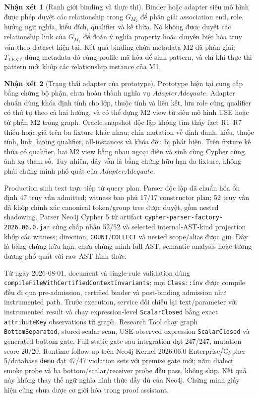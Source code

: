 \documentclass[11pt,a4paper]{article}
\theoremstyle{definition}
\newtheorem{remark}{Nhận xét}
\begin{document}
\begin{remark}[Ranh giới binding và thực thi]
Binder hoặc adapter siêu mô hình được phép duyệt các relationship trong
$G_{M_2}$ để phân giải association end, role, hướng ngữ nghĩa, kiểu đích,
qualifier và kế thừa. Nó không được duyệt các relationship link của $G_{M_1}$
để đoán ý nghĩa property hoặc chuyên biệt hóa truy vấn theo dataset hiện tại.
Kết quả binding chứa metadata M2 đã phân giải; $T_{\mathrm{TEXT}}$ dùng metadata
đó cùng profile mã hóa để sinh pattern, và chỉ khi thực thi pattern mới khớp
các relationship instance của M1.
\end{remark}

\begin{remark}[Trạng thái adapter của prototype]
Prototype hiện tại cung cấp bằng chứng bộ phận, chưa hoàn thành nghĩa vụ
$AdapterAdequate$. Adapter chuẩn dùng khóa định tính cho lớp, thuộc tính và liên
kết, lưu role cùng qualifier có thứ tự theo cả hai hướng, và có thể dựng M2 view
từ siêu mô hình USE hoặc từ phần M2 trong graph. Oracle snapshot độc lập không
tìm thấy fact R1--R7 thiếu hoặc giả trên ba fixture khác nhau; chín mutation về
định danh, kiểu, thuộc tính, link, hướng qualifier, all-instances và khóa đều bị
phát hiện. Trên fixture kế thừa có qualifier, hai M2 view bằng nhau ngoại diên
và sinh cùng Cypher cùng ánh xạ tham số. Tuy nhiên, đây vẫn là bằng chứng hữu hạn
đa fixture, không phải chứng minh phổ quát của $AdapterAdequate$.

Production sinh text trực tiếp từ query plan. Parser độc lập đã chuẩn hóa ổn
định 47 truy vấn admitted; witness bao phủ 17/17 constructor plan; 52 truy vấn
đã khớp chính xác canonical token/group tree được duyệt, gồm nested shadowing.
Parser Neo4j Cypher 5 từ artifact \texttt{cypher-parser-factory-2026.06.0.jar}
cũng chấp nhận 52/52 và selected internal-AST-kind projection khớp các witness;
direction, \texttt{COUNT}/\texttt{COLLECT} và nested scope/alias được giữ. Đây
là bằng chứng hữu hạn, chưa chứng minh full-AST, semantic-analysis hoặc tương
đương phổ quát với raw AST hình thức.

Từ ngày 2026-08-01, document và single-rule validation dùng
\texttt{compileFileWithCertifiedContextInvariants}; mọi \texttt{Class::inv}
được compile đều đi qua pre-admission, certified binder và post-binding
admission như instrumented path. Trước execution, service đối chiếu lại
text/parameter với instrumented result và chạy expression-level
\texttt{ScalarClosed} bằng exact \texttt{attributeKey} observations từ graph.
Research Tool chạy graph \texttt{BottomSeparated}, stored-scalar scan,
USE-observed expression \texttt{ScalarClosed} và generated-bottom gate. Full
static gate sau integration đạt 247/247, mutation score 20/20. Runtime
follow-up trên Neo4j Kernel 2026.06.0 Enterprise/Cypher 5/database
\texttt{demo} đạt 47/47 violation sets với premise gate mới; năm dialect smoke probe
và ba bottom/scalar/receiver probe đều pass, không skip. Kết quả này không thay
thế ngữ nghĩa hình thức đầy đủ của Neo4j. Chứng minh giấy hiện cũng chưa được cơ
giới hóa trong proof assistant.
\end{remark}
\end{document}
